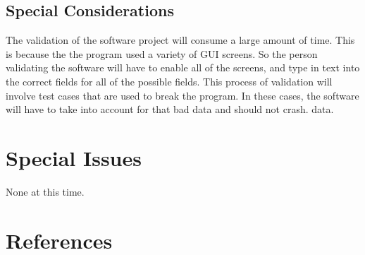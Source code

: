 \subsection{Special Considerations}

The validation of the software project will consume a large amount of
time. This is because the the program used a variety of GUI screens.
So the person validating the software will have to enable all of the
screens, and type in text into the correct fields for all of the
possible fields. This process of validation will involve test cases
that are used to break the program. In these cases, the software will
have to take into account for that bad data and should not crash.
data.

\section{Special Issues}

None at this time.

\appendix
\newpage               %
\section{References}





